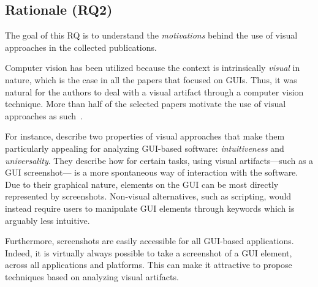 \subsection{Rationale (RQ2)}

The goal of this RQ is to understand the \textit{motivations}
behind the use of visual approaches in the collected publications.

Computer vision has been utilized
because the context is intrinsically \textit{visual} in nature,
which is the case in all the papers that focused on GUIs.
Thus, it was natural for the authors to deal with a visual artifact through a computer vision technique.
More than half of the selected papers motivate the use of visual approaches
as such~\cite{Burg-2015-UIST,Feng-2016-ASE,Deka-2016-UIST,Deka-2017-UIST,canvas_icst2018,
Patric-2016-ASE,Wan-2017-STVR,Scharf-2013-ICSE,Ponzanelli-2016-ICSE,Reiss-2018-ASEj,
Bao-2017-EMSE,Nguyen-2015-ASE,Kirac-2018-JSS,Leotta-2018-STVR,Li-2010-CHI,
Amalfitano-2014-WISE,Selay-2014-DICTA,Mahajan-2015-ICST,Mahajan-2016-ICST,
He-2016-ICWS,Chen-2017-IUI,Xu-2018-TOIT,Delamaro-2011-STVR,Kuchta-2018-EMSE,
Chang-2010-CHI,Alegroth-2013-ICST}. 

For instance, \citet{Chang-2010-CHI} describe two properties of visual approaches
that make them particularly appealing for analyzing GUI-based software:
\textit{intuitiveness} and \textit{universality}.
They describe how for certain tasks, using visual artifacts---such as a GUI screenshot---
is a more spontaneous way of interaction with the software.
Due to their graphical nature, elements on the GUI can be most directly represented
by screenshots. Non-visual alternatives, such as scripting, would instead require users
to manipulate GUI elements through keywords which is arguably less intuitive. 

Furthermore, screenshots are easily accessible for all GUI-based applications.
Indeed, it is virtually always possible to take a screenshot of a GUI element,
across all applications and platforms. This can make it attractive to propose techniques 
based on analyzing visual artifacts.

